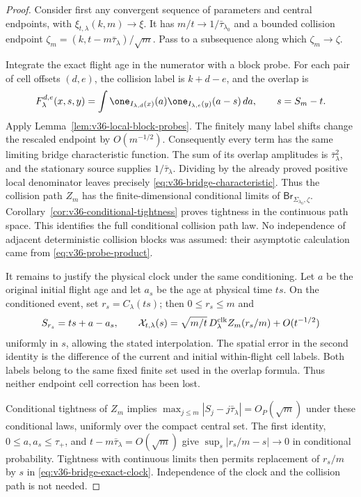 \begin{proof}
Consider first any convergent sequence of parameters and central
endpoints, with $\xi_{t,\lambda}(k,m)\to\xi$. It has
$m/t\to1/\bar\tau_{\lambda_0}$ and a bounded collision endpoint
$\zeta_m=(k,t-m\bar\tau_\lambda)/\sqrt m$.
Pass to a subsequence along which $\zeta_m\to\zeta$.

Integrate the exact flight age in the numerator with a block probe.
For each pair of cell offsets $(d,e)$, the collision label is
$k+d-e$, and the overlap is
\[
 F_\lambda^{d,e}(x,s,y)=
           \int\one_{I_{\lambda,d}(x)}(a)
                       \one_{I_{\lambda,e}(y)}(a-s)\,da,
                        \qquad s=S_m-t.
\]
Apply Lemma~\ref{lem:v36-local-block-probes}. The finitely many label
shifts change the rescaled endpoint by $O(m^{-1/2})$. Consequently
every term has the same limiting bridge characteristic function.
The sum of its overlap amplitudes is $\bar\tau_\lambda^2$, and the
stationary source supplies $1/\bar\tau_\lambda$. Dividing by the
already proved positive local denominator leaves precisely
\eqref{eq:v36-bridge-characteristic}. Thus the collision path $Z_m$
has the finite-dimensional conditional limits of
$\mathsf{Br}_{\Sigma_{\lambda_0},\zeta}$.
Corollary~\ref{cor:v36-conditional-tightness} proves tightness in the
continuous path space. This identifies the full conditional collision
path law. No independence of adjacent deterministic collision blocks
was assumed: their asymptotic calculation came from
\eqref{eq:v36-probe-product}.

It remains to justify the physical clock under the same conditioning.
Let $a$ be the original initial flight age and let $a_s$ be the age
at physical time $ts$. On the conditioned event, set
$r_s=C_\lambda(ts)$; then $0\le r_s\le m$ and
\begin{equation}\label{eq:v36-bridge-exact-clock}
 S_{r_s}=ts+a-a_s,\qquad
 \mathcal X_{t,\lambda}(s)
   =\sqrt{m/t}\,D_\lambda^{\rm clk} Z_m(r_s/m)+O(t^{-1/2})
\end{equation}
uniformly in $s$, allowing the stated interpolation. The spatial
error in the second identity is the difference of the current and
initial within-flight cell labels. Both labels belong to the same
fixed finite set used in the overlap formula. Thus neither endpoint
cell correction has been lost.

Conditional tightness of $Z_m$ implies
$\max_{j\le m}|S_j-j\bar\tau_\lambda|=O_P(\sqrt m)$ under these
conditional laws, uniformly over the compact central set. The first
identity, $0\le a,a_s\le\tau_+$, and
$t-m\bar\tau_\lambda=O(\sqrt m)$ give
$\sup_s|r_s/m-s|\to0$ in conditional probability. Tightness with
continuous limits then permits replacement of $r_s/m$ by $s$ in
\eqref{eq:v36-bridge-exact-clock}. Independence of the clock and the
collision path is not needed.


\end{proof}
